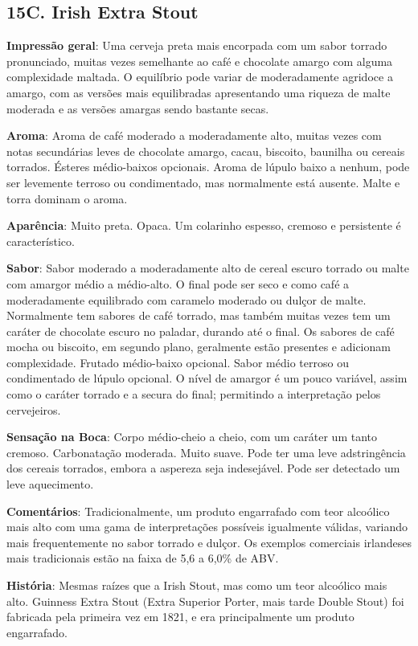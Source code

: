 \subsection*{15C. Irish Extra Stout}
\textbf{Impressão geral}: Uma cerveja preta mais encorpada com um sabor torrado pronunciado, muitas vezes semelhante ao café e chocolate amargo com alguma complexidade maltada. O equilíbrio pode variar de moderadamente agridoce a amargo, com as versões mais equilibradas apresentando uma riqueza de malte moderada e as versões amargas sendo bastante secas.

\textbf{Aroma}: Aroma de café moderado a moderadamente alto, muitas vezes com notas secundárias leves de chocolate amargo, cacau, biscoito, baunilha ou cereais torrados. Ésteres médio-baixos opcionais. Aroma de lúpulo baixo a nenhum, pode ser levemente terroso ou condimentado, mas normalmente está ausente. Malte e torra dominam o aroma.

\textbf{Aparência}: Muito preta. Opaca. Um colarinho espesso, cremoso e persistente é característico.

\textbf{Sabor}: Sabor moderado a moderadamente alto de cereal escuro torrado ou malte com amargor médio a médio-alto. O final pode ser seco e como café a moderadamente equilibrado com caramelo moderado ou dulçor de malte. Normalmente tem sabores de café torrado, mas também muitas vezes tem um caráter de chocolate escuro no paladar, durando até o final. Os sabores de café mocha ou biscoito, em segundo plano, geralmente estão presentes e adicionam complexidade. Frutado médio-baixo opcional. Sabor médio terroso ou condimentado de lúpulo opcional. O nível de amargor é um pouco variável, assim como o caráter torrado e a secura do final; permitindo a interpretação pelos cervejeiros.

\textbf{Sensação na Boca}: Corpo médio-cheio a cheio, com um caráter um tanto cremoso. Carbonatação moderada. Muito suave. Pode ter uma leve adstringência dos cereais torrados, embora a aspereza seja indesejável. Pode ser detectado um leve aquecimento.

\textbf{Comentários}: Tradicionalmente, um produto engarrafado
com teor alcoólico mais alto com uma gama de interpretações
possíveis igualmente válidas, variando mais frequentemente
no sabor torrado e dulçor. Os exemplos comerciais irlandeses
mais tradicionais estão na faixa de 5,6 a 6,0\% de ABV.

\textbf{História}: Mesmas raízes que a Irish Stout, mas como um teor alcoólico mais alto. Guinness Extra Stout (Extra Superior Porter, mais tarde Double Stout) foi fabricada pela primeira vez em 1821, e era principalmente um produto engarrafado.

